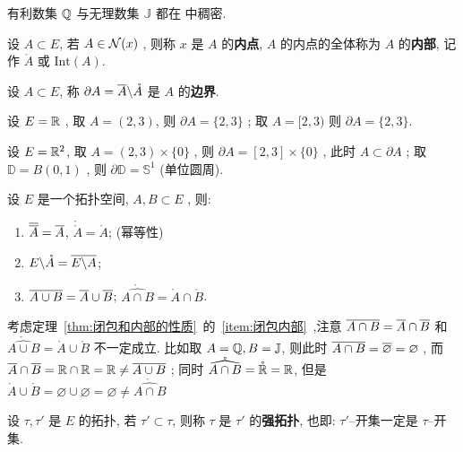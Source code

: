  \begin{Ex}
      有利数集 $ \Q $ 与无理数集 $ \mathbb{J} $ 都在 \R 中稠密. 
 \end{Ex}
 \begin{Def}[内部]\label{def:内部}
       设 $ A\subset E $, 若 $ A\in\CN(x) $ , 则称 $ x $ 是 $ A $ 的\textbf{内点},  $ A $ 的内点的全体称为 $ A $ 的\textbf{内部}, 记作 $ \mathring{A} $ 或 $ \mathrm{Int}(A) $.  
 \end{Def}
 \begin{Def}[边界]\label{def:边界}
       设 $ A\subset E $, 称 $ \partial A = \baro{A}\bs\mathring{A} $ 是 $ A $ 的\textbf{边界}.
 \end{Def}
 \begin{Ex}
      设 $ E=\R $ , 取 $ A = (2, 3) $, 则 $ \partial A = \{ 2, 3 \} $ ; 取 $ A = [2, 3) $ 则 $ \partial A = \{ 2, 3 \} $. 
      
      设 $ E = \R^{2} $, 取 $ A = (2, 3)\times \{0\} $ , 则 $ \partial A = [2, 3]\times \{0\} $ , 此时 $ A\subset \partial A $  ; 取 $ \mathbb{D}=B(0, 1) $ , 则 $ \partial \mathbb{D}=\mathbb{S}^{1} $ (单位圆周). 
 \end{Ex}
 \begin{Thm}\label{thm:闭包和内部的性质}
       设 $ E $ 是一个拓扑空间, $ A, B\subset E $ , 则:
       \begin{enumerate}[(1)]
            \item $ \baro{\baro{A}}=\baro{A} $, $ \mathring{\mathring{A}}=\mathring{A} $; (幂等性)
            \item $ E\bs\mathring{A}=\overline{E\bs A} $;
            \item \label{item:闭包内部}$ \overline {A\cup B}=\baro{A}\cup \baro{B} $; $ \mathring{\widehat{A\cap B}}=\mathring{A}\cap\mathring{B} $.   
       \end{enumerate}
 \end{Thm}
 \begin{Rmk}
      考虑定理~\ref{thm:闭包和内部的性质}~的~\ref{item:闭包内部}~,注意 $ \overline {A\cap B}=\baro{A}\cap \baro{B} $ 和 $ \mathring{\widehat{A\cup B}}=\mathring{A}\cup\mathring{B} $ 不一定成立. 比如取 $ A=\Q, B=\mathbb{J} $, 则此时 $ \overline{A\cap B}=\baro{\varnothing}=\varnothing $  , 而 $ \baro{A}\cap \baro{B}=\R\cap\R=\R\neq\overline {A\cup B} $ ; 同时 $ \mathring{\widehat{A\cap B}}=\mathring{\R}=\R $, 但是 $ \mathring{A}\cup\mathring{B}=\varnothing\cup\varnothing=\varnothing\neq \mathring{\widehat{A\cap B}} $  
 \end{Rmk}
 \begin{Def}[拓扑比较]\label{def:拓扑比较}
       设 $ \tau, \tau' $ 是 $ E $ 的拓扑, 若 $ \tau'\subset\tau $, 则称 $ \tau $ 是 $ \tau' $ 的\textbf{强拓扑}, 也即: $ \tau' $--开集一定是 $ \tau $--开集.   
 \end{Def}
